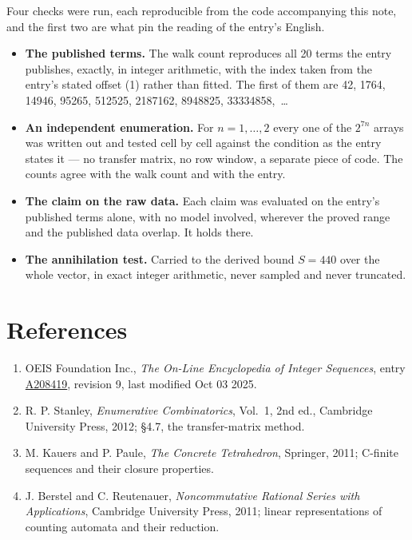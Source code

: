 \documentclass[11pt]{article}
\theoremstyle{definition}
\begin{document}
Four checks were run, each reproducible from the code accompanying this note, and the first two are what pin the reading of the entry's English.

\begin{itemize}

\item {\bfseries The published terms.} The walk count reproduces all 20 terms the entry publishes, exactly, in integer arithmetic, with the index taken from the entry's stated offset (1) rather than fitted. The first of them are 42, 1764, 14946, 95265, 512525, 2187162, 8948825, 33334858,~\dots

\item {\bfseries An independent enumeration.} For $n = 1,\dots,2$ every one of the $2^{7n}$ arrays was written out and tested cell by cell against the condition as the entry states it --- no transfer matrix, no row window, a separate piece of code. The counts agree with the walk count and with the entry.

\item {\bfseries The claim on the raw data.} Each claim was evaluated on the entry's published terms alone, with no model involved, wherever the proved range and the published data overlap. It holds there.

\item {\bfseries The annihilation test.} Carried to the derived bound $S = 440$ over the whole vector, in exact integer arithmetic, never sampled and never truncated.

\end{itemize}

\section{References}

\begin{enumerate}

\item OEIS Foundation Inc., \emph{The On-Line Encyclopedia of Integer Sequences}, entry \href{https://oeis.org/A208419}{A208419}, revision 9, last modified Oct 03 2025.

\item R. P. Stanley, \emph{Enumerative Combinatorics}, Vol.~1, 2nd ed., Cambridge University Press, 2012; \S4.7, the transfer-matrix method.

\item M. Kauers and P. Paule, \emph{The Concrete Tetrahedron}, Springer, 2011; C-finite sequences and their closure properties.

\item J. Berstel and C. Reutenauer, \emph{Noncommutative Rational Series with Applications}, Cambridge University Press, 2011; linear representations of counting automata and their reduction.

\end{enumerate}
\end{document}
